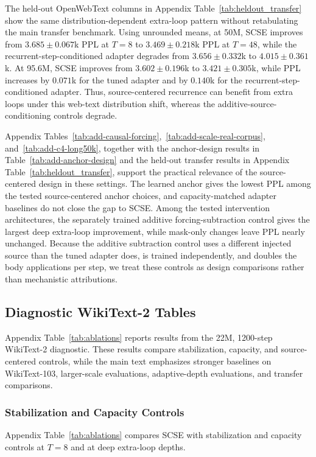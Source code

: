 \documentclass[letterpaper]{article} %
\newcommand{\SCSE}{\textsc{SCSE}}
\theoremstyle{remark}
\begin{document}
The held-out OpenWebText columns in Appendix Table~\ref{tab:heldout_transfer} show the same distribution-dependent extra-loop pattern without retabulating the main transfer benchmark.  Using unrounded means, at 50M, \SCSE{} improves from $3.685\pm0.067$k PPL at $T=8$ to $3.469\pm0.218$k PPL at $T=48$, while the recurrent-step-conditioned adapter degrades from $3.656\pm0.332$k to $4.015\pm0.361$k.  At 95.6M, \SCSE{} improves from $3.602\pm0.196$k to $3.421\pm0.305$k, while PPL increases by $0.071$k for the tuned adapter and by $0.140$k for the recurrent-step-conditioned adapter.  Thus, source-centered recurrence can benefit from extra loops under this web-text distribution shift, whereas the additive-source-conditioning controls degrade.

Appendix Tables~\ref{tab:add-causal-forcing},~\ref{tab:add-scale-real-corpus}, and~\ref{tab:add-c4-long50k}, together with the anchor-design results in Table~\ref{tab:add-anchor-design} and the held-out transfer results in Appendix Table~\ref{tab:heldout_transfer}, support the practical relevance of the source-centered design in these settings.  The learned anchor gives the lowest PPL among the tested source-centered anchor choices, and capacity-matched adapter baselines do not close the gap to \SCSE{}.  Among the tested intervention architectures, the separately trained additive forcing-subtraction control gives the largest deep extra-loop improvement, while mask-only changes leave PPL nearly unchanged.  Because the additive subtraction control uses a different injected source than the tuned adapter does, is trained independently, and doubles the body applications per step, we treat these controls as design comparisons rather than mechanistic attributions.

\subsection{Diagnostic WikiText-2 Tables}
\label{app:diagnostic-wt2}
Appendix Table~\ref{tab:ablations} reports results from the 22M, 1200-step WikiText-2 diagnostic.  These results compare stabilization, capacity, and source-centered controls, while the main text emphasizes stronger baselines on WikiText-103, larger-scale evaluations, adaptive-depth evaluations, and transfer comparisons.

\subsubsection{Stabilization and Capacity Controls}
Appendix Table~\ref{tab:ablations} compares \SCSE{} with stabilization and capacity controls at $T=8$ and at deep extra-loop depths.
\end{document}
